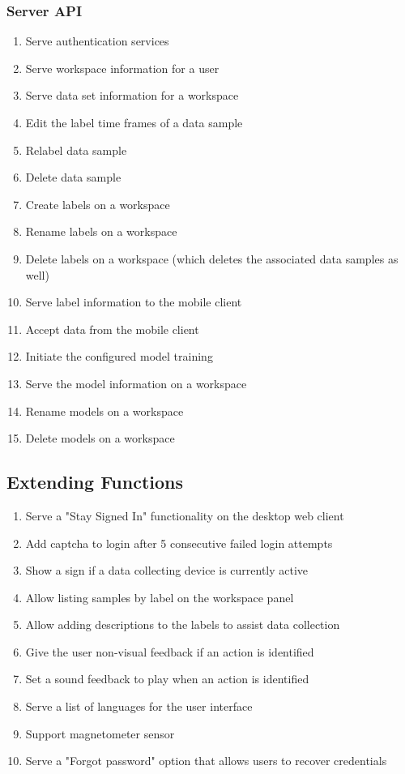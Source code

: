 \subsubsection{Server API}
\begin{enumerate}[resume*]
    \item \label{itm:authentication}Serve authentication services
    \item Serve workspace information for a user
    \item Serve data set information for a workspace
    \item Edit the label time frames of a data sample
    \item Relabel data sample
    \item Delete data sample
    \item Create labels on a workspace
    \item Rename labels on a workspace
    \item Delete labels on a workspace (which deletes the associated data samples as well)
    \item Serve label information to the mobile client
    \item Accept data from the mobile client
    \item Initiate the configured model training
    \item Serve the model information on a workspace
    \item Rename models on a workspace
    \item Delete models on a workspace
\end{enumerate}

\subsection{Extending Functions}
\begin{enumerate}[resume*]
    \item \label{itm:stay-signed}Serve a "Stay Signed In" functionality on the desktop web client
    \item \label{itm:captcha}Add captcha to login after 5 consecutive failed login attempts
    \item \label{itm:active-sign}Show a sign if a data collecting device is currently active
    \item \label{itm:filter-by-label}Allow listing samples by label on the workspace panel
    \item \label{itm:label-description}Allow adding descriptions to the labels to assist data collection
    \item \label{itm:nonvisual-feedback} Give the user non-visual feedback if an action is identified
    \item \label{itm:sound-feedback}Set a sound feedback to play when an action is identified
    \item \label{itm:language}Serve a list of languages for the user interface
    \item \label{itm:magnetometer}Support magnetometer sensor
    \item \label{itm:forgot-password}Serve a "Forgot password" option that allows users to recover credentials
\end{enumerate}